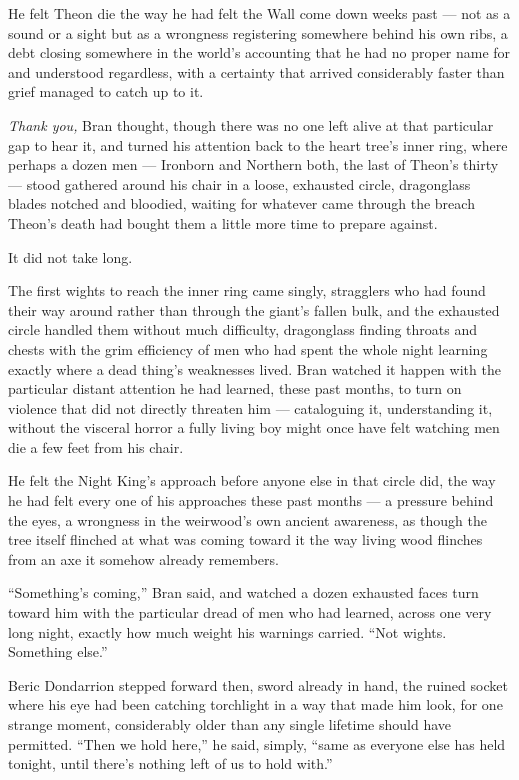 He felt Theon die the way he had felt the Wall come down weeks past — not as a sound or a sight but as a wrongness registering somewhere behind his own ribs, a debt closing somewhere in the world’s accounting that he had no proper name for and understood regardless, with a certainty that arrived considerably faster than grief managed to catch up to it.

\textit{Thank you,} Bran thought, though there was no one left alive at that particular gap to hear it, and turned his attention back to the heart tree’s inner ring, where perhaps a dozen men — Ironborn and Northern both, the last of Theon’s thirty — stood gathered around his chair in a loose, exhausted circle, dragonglass blades notched and bloodied, waiting for whatever came through the breach Theon’s death had bought them a little more time to prepare against.

It did not take long.

\sceneBreak

The first wights to reach the inner ring came singly, stragglers who had found their way around rather than through the giant’s fallen bulk, and the exhausted circle handled them without much difficulty, dragonglass finding throats and chests with the grim efficiency of men who had spent the whole night learning exactly where a dead thing’s weaknesses lived. Bran watched it happen with the particular distant attention he had learned, these past months, to turn on violence that did not directly threaten him — cataloguing it, understanding it, without the visceral horror a fully living boy might once have felt watching men die a few feet from his chair.

He felt the Night King’s approach before anyone else in that circle did, the way he had felt every one of his approaches these past months — a pressure behind the eyes, a wrongness in the weirwood’s own ancient awareness, as though the tree itself flinched at what was coming toward it the way living wood flinches from an axe it somehow already remembers.

“Something’s coming,” Bran said, and watched a dozen exhausted faces turn toward him with the particular dread of men who had learned, across one very long night, exactly how much weight his warnings carried. “Not wights. Something else.”

Beric Dondarrion stepped forward then, sword already in hand, the ruined socket where his eye had been catching torchlight in a way that made him look, for one strange moment, considerably older than any single lifetime should have permitted. “Then we hold here,” he said, simply, “same as everyone else has held tonight, until there’s nothing left of us to hold with.”


